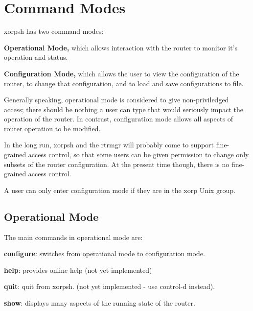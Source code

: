 \documentclass[11pt]{article}
\newcommand{\xorpsh}{{\sf\small xorpsh}\xspace}
\begin{document}
\section{Command Modes}

\xorpsh has two command modes:
\begin{description}
\item{\bf Operational Mode,}  which allows interaction with the router
to monitor it's operation and status.
\item{\bf Configuration Mode,} which allows the user to view the
configuration of the router, to change that configuration, and to
load and save configurations to file.
\end{description}
Generally speaking, operational mode is considered to give
non-priviledged access; there should be nothing a user can type that
would seriously impact the operation of the router.  In contrast,
configuration mode allows all aspects of router operation to be
modified.

In the long run, \xorpsh and the rtrmgr will probably come to support
fine-grained access control, so that some users can be given
permission to change only subsets of the router configuration.  At the
present time though, there is no fine-grained access control.

A user can only enter configuration mode if they are in the xorp Unix
group.

\subsection{Operational Mode}
\noindent{}
\vspace{0.1in}

The main commands in operational mode are:
\begin{description}
\item{\bf configure}: switches from operational mode to configuration
mode.
\item{\bf help}: provides online help (not yet implemented)
\item{\bf quit}: quit from xorpsh.  (not yet implemented - use
control-d instead).
\item{\bf show}: displays many aspects of the running state of the
router.
\end{description}
\end{document}
